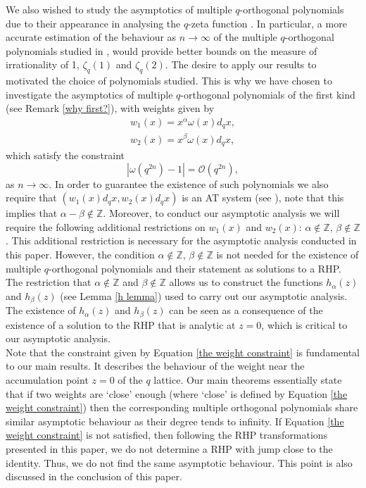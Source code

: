\documentclass[a4paper,reqno]{amsart}
\numberwithin{equation}{section}
\numberwithin{figure}{section}
\begin{document}
We also wished to study the asymptotics of multiple $q$-orthogonal polynomials due to their appearance in analysing the $q$-zeta function \cite{POSTELMANS2007119}. In particular, a more accurate estimation of the behaviour as $n\to \infty$ of the multiple $q$-orthogonal polynomials studied in \cite{POSTELMANS2007119}, would provide better bounds on the measure of irrationality of 1, $\zeta_q(1)$ and $\zeta_q(2)$. The desire to apply our results to \cite{POSTELMANS2007119} motivated the choice of polynomials studied. This is why we have chosen to investigate the asymptotics of multiple $q$-orthogonal polynomials of the first kind (see Remark \ref{why first?}), with weights given by
\begin{subequations}\label{the general weights}
    \begin{eqnarray}
    w_1(x) = x^\alpha \omega(x)d_qx,\\
    w_2(x) = x^\beta \omega(x)d_qx,
\end{eqnarray}
\end{subequations}
which satisfy the constraint
\begin{equation}\label{the weight constraint}
    |\omega(q^{2n})-1| = \mathcal{O}(q^{2n}), 
\end{equation}
as $n\to \infty$. In order to guarantee the existence of such polynomials we also require that $(w_1(x)d_qx,w_2(x)d_qx)$ is an AT system (see \cite[Chapter 23]{ismail2005classical}), note that this implies that $\alpha - \beta \notin \mathbb{Z}$. Moreover, to conduct our asymptotic analysis we will require the following additional restrictions on $w_1(x)$ and $w_2(x)$: $\alpha \notin \mathbb{Z}$, $\beta \notin \mathbb{Z}$. This additional restriction is necessary for the asymptotic analysis conducted in this paper. However, the condition $\alpha \notin \mathbb{Z}$, $\beta \notin \mathbb{Z}$ is not needed for the existence of multiple $q$-orthogonal polynomials and their statement as solutions to a RHP. The restriction that $\alpha \notin \mathbb{Z}$ and $\beta \notin \mathbb{Z}$ allows us to construct the functions $h_\alpha(z)$ and $h_\beta (z)$ (see Lemma \ref{h lemma}) used to carry out our asymptotic analysis. The existence of $h_\alpha(z)$ and $h_\beta(z)$ can be seen as a consequence of the existence of a solution to the RHP that is analytic at $z=0$, which is critical to our asymptotic analysis. \\

Note that the constraint given by Equation \eqref{the weight constraint} is fundamental to our main results. It describes the behaviour of the weight near the accumulation point $z=0$ of the $q$ lattice. Our main theorems essentially state that if two weights are `close' enough (where `close' is defined by Equation \eqref{the weight constraint}) then the corresponding multiple orthogonal polynomials share similar asymptotic behaviour as their degree tends to infinity. If Equation \eqref{the weight constraint} is not satisfied, then following the RHP transformations presented in this paper, we do not determine a RHP with jump close to the identity. Thus, we do not find the same asymptotic behaviour. This point is also discussed in the conclusion of this paper.\\
\end{document}
